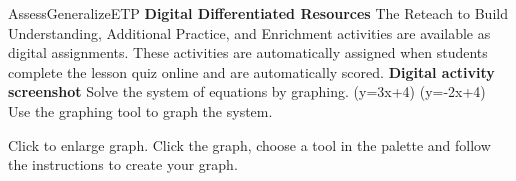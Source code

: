 \documentclass{article}
\newenvironment{te-addendum}[2]{}{}     %
\newcommand{\placeholder}[2]{}          %
\newcommand{\te}[1]{}                   %
\begin{document}
\begin{te-addendum}{Assess}{GeneralizeETP}
\textbf{Digital Differentiated Resources}
The Reteach to Build Understanding, Additional Practice, and Enrichment activities are available as digital assignments. These activities are automatically assigned when students complete the lesson quiz online and are automatically scored.
\textbf{Digital activity screenshot}
Solve the system of equations by graphing.
(y=3x+4)
(y=-2x+4)
Use the graphing tool to graph the system.
\placeholder{graph}{Digital exercise blank Cartesian grid with x/y axes and arrowheads, origin O, unit grid lines, numbered -10,-8,-6,-4,-2,2,4,6,8,10 on both axes. Window [-10,10] by [-10,10]; no functions or points plotted. A Question Help menu overlays the upper-right quadrant.}
Click to enlarge graph.
Click the graph, choose a tool in the palette and follow the instructions to create your graph.
\te{Interface labels: Exit; Question Help; Help Me Solve This; View an Example; Video; Textbook; Glossary; Math Tools; Print; 1 part remaining; Clear All; Check Answer; Review progress; Question 5 of 14; Go; Back; Next. The resource previews bear “enVision Algebra 2 • Teaching Resources,” SavvasRealize.com, and a copyright notice.}
\end{te-addendum}
\end{document}
